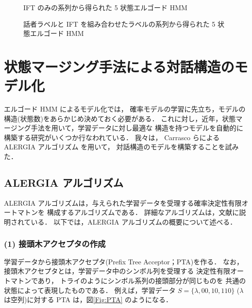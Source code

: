\begin{figure}
\begin{center}
\end{center}
\caption{IFT のみの系列から得られた 5 状態エルゴード HMM}
\label{Fig:HMM-IFT}
\end{figure}

\begin{figure}
\begin{center}
\end{center}
\caption{話者ラベルと IFT を組み合わせたラベルの系列から得られた 5 状態エルゴード HMM}
\label{Fig:HMM-IFT-SP}
\end{figure}

\section{状態マージング手法による対話構造のモデル化}

エルゴード HMM によるモデル化では，
確率モデルの学習に先立ち，モデルの構造(状態数)をあらかじめ決めておく必要がある．
これに対し，近年，状態マージング手法を用いて，学習データに対し最適な
構造を持つモデルを自動的に構築する研究がいくつか行なわれている\cite{Stolcke94a,Stolcke94b}．
我々は，
Carrasco らによる ALERGIA アルゴリズム\cite{Carrasco94} を用いて，
対話構造のモデルを構築することを試みた．

\subsection{ALERGIA アルゴリズム}

ALERGIA アルゴリズムは，与えられた学習データを受理する確率決定性有限オートマトンを
構成するアルゴリズムである．
詳細なアルゴリズムは，文献\cite{Carrasco94}に説明されている．
以下では，ALERGIA アルゴリズムの概要について述べる．


\subsubsection*{(1) 接頭木アクセプタの作成}

学習データから接頭木アクセプタ(Prefix Tree Acceptor；PTA)を作る．
なお，接頭木アクセプタとは，学習データ中のシンボル列を受理する
決定性有限オートマトンであり，
トライのようにシンボル系列の接頭部分が同じものを
共通の状態によって表現したものである．
例えば，学習データ $S = \{ \lambda, 00, 10, 110 \}$ ($\lambda$ は空列)に対する
PTA は，図\ref{Fig:PTA} のようになる．

